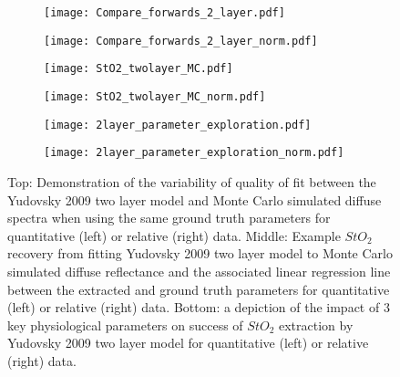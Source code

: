 \begin{figure}[htbp]
    \centering
    \begin{subfigure}{0.49\textwidth}
        \texttt{[image: Compare\_forwards\_2\_layer.pdf]}
        \caption{}
        \label{fig:egtwolayerMCforwards}
    \end{subfigure}
    \begin{subfigure}{0.49\textwidth}
        \texttt{[image: Compare\_forwards\_2\_layer\_norm.pdf]}
        \caption{}
        \label{fig:egtwolayerMCforwardsnorm}
    \end{subfigure}
    \begin{subfigure}{0.49\textwidth}
        \texttt{[image: StO2\_twolayer\_MC.pdf]}
        \caption{}
        \label{fig:egparamsStO2MC}
    \end{subfigure}
    \begin{subfigure}{0.49\textwidth}
        \texttt{[image: StO2\_twolayer\_MC\_norm.pdf]}
        \caption{}
        \label{fig:egparamsStO2MCnorm}
    \end{subfigure}
    \begin{subfigure}{0.49\textwidth}
        \texttt{[image: 2layer\_parameter\_exploration.pdf]}
        \caption{}
        \label{fig:egparamsfailureMC}
    \end{subfigure}
    \begin{subfigure}{0.49\textwidth}
        \texttt{[image: 2layer\_parameter\_exploration\_norm.pdf]}
        \caption{}
        \label{fig:egparamsfailureMCnorm}
    \end{subfigure}
    \caption{Top: Demonstration of the variability of quality of fit between the Yudovsky 2009 two layer model and Monte Carlo simulated diffuse spectra when using the same ground truth parameters for quantitative (left) or relative (right) data. Middle: Example $StO_2$ recovery from fitting Yudovsky 2009 two layer model to Monte Carlo simulated diffuse reflectance and the associated linear regression line between the extracted and ground truth parameters for quantitative (left) or relative (right) data. Bottom: a depiction of the impact of 3 key physiological parameters on success of $StO_2$ extraction by Yudovsky 2009 two layer model for quantitative (left) or relative (right) data.}
    \label{fig:MC2layer}
\end{figure}


